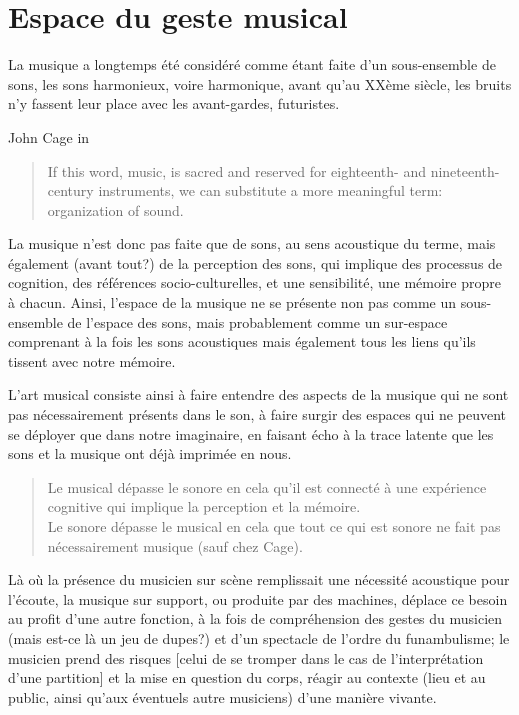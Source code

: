 \section{Espace du geste musical}
La musique a longtemps été considéré comme étant faite d'un sous-ensemble de sons, les sons harmonieux, voire harmonique, avant qu'au XXème siècle, les bruits n'y fassent leur place avec les avant-gardes, futuristes. 

John Cage in \cite{cage_silence:_1961}
\begin{quotation}
\noindent If this word, music, is sacred and reserved for eighteenth- and nineteenth-century instruments, we can substitute a more meaningful term: organization of sound.\\
\end{quotation}


La musique n'est donc pas faite que de sons, au sens acoustique du terme, mais également (avant tout?) de la perception des sons, qui implique des processus de cognition, des références socio-culturelles, et une sensibilité, une mémoire propre à chacun. 
Ainsi, l'espace de la musique ne se présente non pas comme un sous-ensemble de l'espace des sons, mais probablement comme un sur-espace comprenant à la fois les sons acoustiques mais également tous les liens qu'ils tissent avec notre mémoire.

L'art musical consiste ainsi à faire entendre des aspects de la musique qui ne sont pas nécessairement présents dans le son, à faire surgir des espaces qui ne peuvent se déployer que dans notre imaginaire, en faisant écho à la trace latente que les sons et la musique ont déjà imprimée en nous.


\begin{quotation}
\noindent Le musical dépasse le sonore en cela qu’il est connecté à une expérience cognitive qui implique la perception et la mémoire.\\
Le sonore dépasse le musical en cela que tout ce qui est sonore ne fait pas nécessairement musique (sauf chez Cage).
\end{quotation}

Là où la présence du musicien sur scène remplissait une nécessité acoustique pour l’écoute, la musique sur support, ou produite par des machines, déplace ce besoin au profit d’une autre fonction, à la fois de compréhension des gestes du musicien (mais est-ce là un jeu de dupes?) et d’un spectacle de l’ordre du funambulisme; le musicien prend des risques [celui de se tromper dans le cas de l’interprétation d’une partition] et la mise en question du corps, réagir au contexte (lieu et au public, ainsi qu’aux éventuels autre musiciens) d’une manière vivante.

